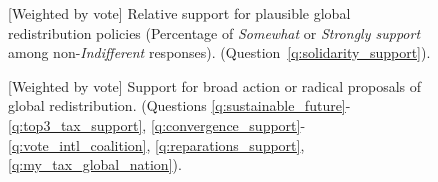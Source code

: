 \begin{figure}[h!]
\begin{subfigure}{.49\textwidth}
\end{subfigure}
\end{figure}

\begin{figure}[h!]
    \caption[{[}Weighted by vote{]} Relative support for plausible global policies]{[Weighted by vote] Relative support for plausible global redistribution policies (Percentage of \textit{Somewhat} or \textit{Strongly support} among non-\textit{Indifferent} responses). (Question~\ref{q:solidarity_support}).
    }\label{fig:solidarity_support_share_weight_vote}
\end{figure}
\begin{figure}[h!]
    \caption[{[}Weighted by vote{]} Support for broad or radical global redistribution]{[Weighted by vote] Support for broad action or radical proposals of global redistribution. \hfill (Questions \ref{q:sustainable_future}-\ref{q:top3_tax_support}, \ref{q:convergence_support}-\ref{q:vote_intl_coalition}, \ref{q:reparations_support}, \ref{q:my_tax_global_nation}).
    }\label{fig:radical_redistr_share_weight_vote} 
\end{figure}

